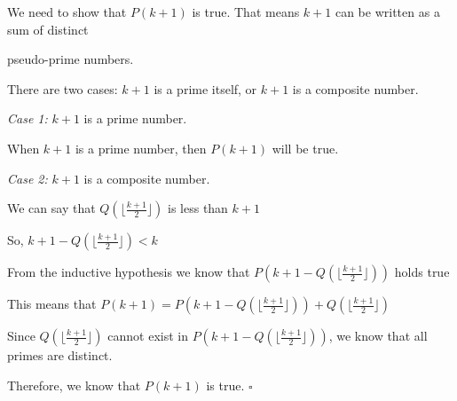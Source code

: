 \documentclass{article} %
\begin{document}
    We need to show that $P(k + 1)$ is true. That means $k + 1$ can be written as a sum of distinct 
    
    pseudo-prime numbers.

    There are two cases: $k + 1$ is a prime itself, or $k + 1$ is a composite number.

    \textit{Case 1:} $k + 1$ is a prime number.

    \tabto{1cm} When $k + 1$ is a prime number, then $P(k + 1)$ will be true.

    \textit{Case 2:} $k + 1$ is a composite number.

    \tabto{1cm} We can say that $Q(\lfloor \frac{k + 1}{2} \rfloor)$ is less than $k + 1$

    \tabto{1cm} So, $k + 1 - Q(\lfloor \frac{k + 1}{2} \rfloor) < k$

    \vspace*{0.1cm}
    
    \tabto{1cm} From the inductive hypothesis we know that $P(k + 1 - Q(\lfloor \frac{k + 1}{2} \rfloor))$ holds true
    \vspace*{0.1cm}

    \tabto{1cm} This means that $P(k + 1) = P(k + 1 - Q(\lfloor \frac{k + 1}{2} \rfloor)) + Q(\lfloor \frac{k + 1}{2} \rfloor)$
    \vspace*{0.1cm}

    \tabto{1cm} Since $Q(\lfloor \frac{k + 1}{2} \rfloor)$ cannot exist in $P(k + 1 - Q(\lfloor \frac{k + 1}{2} \rfloor))$, we know that all primes are distinct.
    \vspace*{0.1cm}
    
    Therefore, we know that $P(k + 1)$ is true. $\square$
\end{document}
